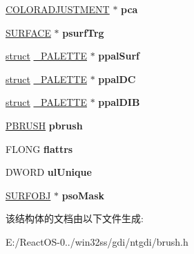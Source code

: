 \begin{DoxyCompactItemize}
\item 
\mbox{\label{struct___e_b_r_u_s_h_o_b_j_aff71be71e2374833fbac41fae2ab1b40}} 
\hyperlink{structtag_c_o_l_o_r_a_d_j_u_s_t_m_e_n_t}{C\+O\+L\+O\+R\+A\+D\+J\+U\+S\+T\+M\+E\+NT} $\ast$ {\bfseries pca}
\item 
\mbox{\label{struct___e_b_r_u_s_h_o_b_j_adde951d193712fa4d451fe53c5ea29c2}} 
\hyperlink{struct___s_u_r_f_a_c_e}{S\+U\+R\+F\+A\+CE} $\ast$ {\bfseries psurf\+Trg}
\item 
\mbox{\label{struct___e_b_r_u_s_h_o_b_j_a48fa5272f1481a9d39a73f4ae358639b}} 
\hyperlink{interfacestruct}{struct} \hyperlink{struct___p_a_l_e_t_t_e}{\+\_\+\+P\+A\+L\+E\+T\+TE} $\ast$ {\bfseries ppal\+Surf}
\item 
\mbox{\label{struct___e_b_r_u_s_h_o_b_j_a8f7693e0132a0a0704b2b938efa9202e}} 
\hyperlink{interfacestruct}{struct} \hyperlink{struct___p_a_l_e_t_t_e}{\+\_\+\+P\+A\+L\+E\+T\+TE} $\ast$ {\bfseries ppal\+DC}
\item 
\mbox{\label{struct___e_b_r_u_s_h_o_b_j_a97fa1268f2a30e011ac16b6a346f0773}} 
\hyperlink{interfacestruct}{struct} \hyperlink{struct___p_a_l_e_t_t_e}{\+\_\+\+P\+A\+L\+E\+T\+TE} $\ast$ {\bfseries ppal\+D\+IB}
\item 
\mbox{\label{struct___e_b_r_u_s_h_o_b_j_a093de07d93110a8b4b63735d4e6904f0}} 
\hyperlink{struct___b_r_u_s_h}{P\+B\+R\+U\+SH} {\bfseries pbrush}
\item 
\mbox{\label{struct___e_b_r_u_s_h_o_b_j_abe2799cc332b0a553117cf6bf28aa115}} 
F\+L\+O\+NG {\bfseries flattrs}
\item 
\mbox{\label{struct___e_b_r_u_s_h_o_b_j_aafed4686568f94e781b2c724a12f282c}} 
D\+W\+O\+RD {\bfseries ul\+Unique}
\item 
\mbox{\label{struct___e_b_r_u_s_h_o_b_j_ad2535adc79755bc435c28de2250a3555}} 
\hyperlink{struct___s_u_r_f_o_b_j}{S\+U\+R\+F\+O\+BJ} $\ast$ {\bfseries pso\+Mask}
\end{DoxyCompactItemize}


该结构体的文档由以下文件生成\+:\begin{DoxyCompactItemize}
\item 
E\+:/\+React\+O\+S-\/0../win32ss/gdi/ntgdi/brush.\+h\end{DoxyCompactItemize}
